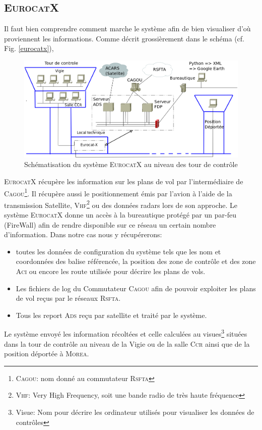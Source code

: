     \subsection{\textsc{EurocatX}}
Il faut bien comprendre comment marche le système afin de bien visualiser d'où proviennent les informations. Comme décrit grossièrement dans le schéma (cf. Fig. \vref{eurocatx}),
\begin{figure}
    \center
    \includegraphics[width=15cm]{images/SchemaControle.png}
    \caption{Schématisation du système \textsc{EurocatX} au niveau des tour de contrôle}
    \label{eurocatx}
\end{figure}
\textsc{EurocatX} récupère les information sur les plans de vol par l'intermédiaire de \textsc{Cagou}\footnote{\textsc{Cagou}: nom donné au commutateur \textsc{Rsfta}}. Il récupère aussi le positionnement émis par l'avion à l'aide de la transmission Satellite, \textsc{Vhf}\footnote{\textsc{Vhf}: Very High Frequency, soit une bande radio de très haute fréquence} ou des données radars lors de son approche. Le système \textsc{EurocatX} donne un accès à la bureautique protégé par un par-feu (FireWall) afin de rendre disponible sur ce réseau un certain nombre d'information. Dans notre cas nous y récupérerons:
\begin{itemize}
    \item toutes les données de configuration du système tels que les nom et coordonnées des balise référencée, la position des zone de contrôle et des zone \textsc{Aci} ou encore les route utilisée pour décrire les plans de vols.
    \item Les fichiers de log du Commutateur \textsc{Cagou} afin de pouvoir exploiter les plans de vol reçus par le réseaux \textsc{Rsfta}.
    \item Tous les report \textsc{Ads} reçu par satellite et traité par le système.
\end{itemize} 
Le système envoyé les information récoltées et celle calculées au visues\footnote{Visue: Nom pour décrire les ordinateur utilisés pour visualiser les données de contrôles} situées dans la tour de contrôle au niveau de la Vigie ou de la salle \textsc{Ccr} ainsi que de la position déportée à \textsc{Morea}.

